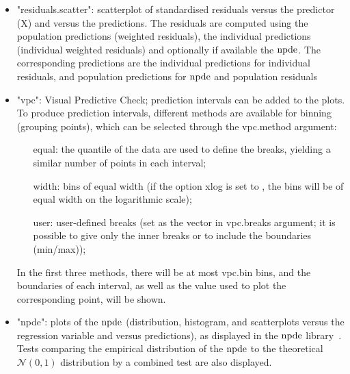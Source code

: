\begin{itemize}
\item "residuals.scatter": scatterplot of standardised residuals versus the predictor (X) and versus the predictions. The residuals are computed using the population predictions (weighted residuals), the individual predictions (individual weighted residuals) and optionally if available the ${\rm npde}$. The corresponding predictions are the individual predictions for individual residuals, and population predictions for ${\rm npde}$ and population residuals
\item "vpc": Visual Predictive Check; prediction intervals can be added to the plots. To produce prediction intervals, different methods are available for binning (grouping points), which can be selected through the {\sf vpc.method} argument:
\begin{itemize}
\item[{\sf equal}:] the quantile of the data are used to define the breaks, yielding a similar number of points in each interval;
\item[{\sf width}:] bins of equal width (if the option {\sf xlog} is set to \true, the bins will be of equal width on the logarithmic scale);
\item[{\sf user}:] user-defined breaks (set as the vector in {\sf vpc.breaks} argument; it is possible to give only the inner breaks or to include the boundaries (min/max));
\end{itemize}
In the first three methods, there will be at most {\sf vpc.bin} bins, and the boundaries of each interval, as well as the value used to plot the corresponding point, will be shown.
\item "npde": plots of the ${\rm npde}$ (distribution, histogram, and scatterplots versus the regression variable and versus predictions), as displayed in the ${\rm npde}$ library~\cite{CometsCMPB08}. Tests comparing the empirical distribution of the ${\rm npde}$ to the theoretical $\mathcal{N}(0,1)$ distribution by a combined test are also displayed.
\end{itemize}
